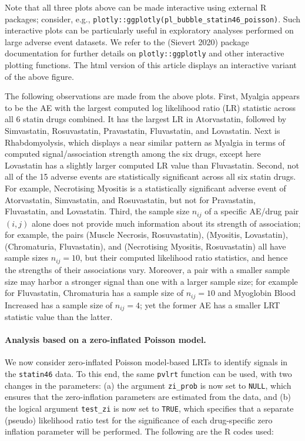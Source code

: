 \noindent Note that all three plots above can be made interactive using external R packages; consider, e.g., \texttt{plotly::ggplotly(pl\_bubble\_statin46\_poisson)}. Such interactive plots can be particularly useful in exploratory analyses performed on large adverse event datasets. We refer to the  (Sievert 2020) package documentation for further details on \texttt{plotly::ggplotly} and other interactive plotting functions. The html version of this article displays an interactive variant of the above figure.

The following observations are made from the above plots. First, Myalgia appears to be the AE with the largest computed log likelihood ratio (LR) statistic across all 6 statin drugs combined. It has the largest LR in Atorvastatin, followed by Simvastatin, Rosuvastatin, Pravastatin, Fluvastatin, and Lovastatin. Next is Rhabdomyolysis, which displays a near similar pattern as Myalgia in terms of computed signal/association strength among the six drugs, except here Lovastatin has a slightly larger computed LR value than Fluvastatin. Second, not all of the 15 adverse events are statistically significant across all six statin drugs. For example, Necrotising Myositis is a statistically significant adverse event of Atorvastatin, Simvastatin, and Rosuvastatin, but not for Pravastatin, Fluvastatin, and Lovastatin. Third, the sample size \(n_{i j}\) of a specific AE/drug pair \((i, j)\) alone does not provide much information about its strength of association; for example, the pairs (Muscle Necrosis, Rosuvastatin), (Myositis, Lovastatin), (Chromaturia, Fluvastatin), and (Necrotising Myositis, Rosuvastatin) all have sample sizes \(n_{ij} = 10\), but their computed likelihood ratio statistics, and hence the strengths of their associations vary. Moreover, a pair with a smaller sample size may harbor a stronger signal than one with a larger sample size; for example for Fluvastatin, Chromaturia has a sample size of \(n_{ij} = 10\) and Myoglobin Blood Increased has a sample size of \(n_{ij} = 4\); yet the former AE has a smaller LRT statistic value than the latter.

\hypertarget{analysis-based-on-a-zero-inflated-poisson-model.}{%
\paragraph{Analysis based on a zero-inflated Poisson model.}\label{analysis-based-on-a-zero-inflated-poisson-model.}}

We now consider zero-inflated Poisson model-based LRTs to identify signals in the \texttt{statin46} data. To this end, the same \texttt{pvlrt} function can be used, with two changes in the parameters: (a) the argument \texttt{zi\_prob} is now set to \texttt{NULL}, which ensures that the zero-inflation parameters are estimated from the data, and (b) the logical argument \texttt{test\_zi} is now set to \texttt{TRUE}, which specifies that a separate (pseudo) likelihood ratio test for the significance of each drug-specific zero inflation parameter will be performed. The following are the R codes used:

